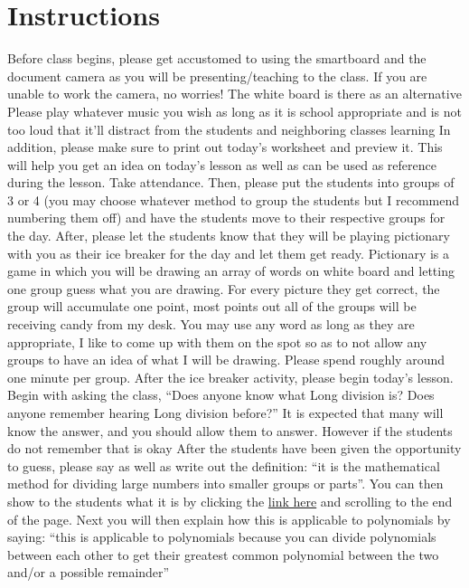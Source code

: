 \section{Instructions}

\begin{outline}
    \1 Before class begins, please get accustomed to using the smartboard and the document camera as you will be presenting/teaching to the class. If you are unable to work the camera, no worries! The white board is there as an alternative
        \2 Please play whatever music you wish as long as it is school appropriate and is not too loud that it'll distract from the students and neighboring classes learning 
        \2 In addition, please make sure to print out today's worksheet and preview it. This will help you get an idea on today's lesson as well as can be used as reference during the lesson.
    \1 Take attendance. Then, please put the students into groups of 3 or 4 (you may choose whatever method to group the students but I recommend numbering them off) and have the students move to their respective groups for the day. After, please let the students know that they will be playing pictionary with you as their ice breaker for the day and let them get ready.
        \2 Pictionary is a game in which you will be drawing an array of words on white board and letting one group guess what you are drawing. For every picture they get correct, the group will accumulate one point, most points out all of the groups will be receiving candy from my desk. 
            \3 You may use any word as long as they are appropriate, I like to come up with them on  the spot so as to not allow any groups to have an idea of what I will be drawing. 
            \3 Please spend roughly around one minute per group.
    \1 After the ice breaker activity, please begin today's lesson. Begin with asking the class, “Does anyone know what Long division is? Does anyone remember hearing Long division before?”
        \2 It is expected that many will know the answer, and you should allow them to answer. However if the students do not remember that is okay
    \1 After the students have been given the opportunity to guess, please say as well as write out the definition: “it is the mathematical method for dividing large numbers into smaller groups or parts”. You can then show to the students what it is by clicking the \href{https://www.houseofmath.com/encyclopedia/numbers-and-quantities/arithmetic/division/how-to-do-long-division}{link here} and scrolling to the end of the page. Next you will then explain how this is applicable to polynomials by saying: “this is applicable to polynomials because you can divide polynomials between each other to get their greatest common polynomial between the two and/or a possible remainder”

\end{outline}

